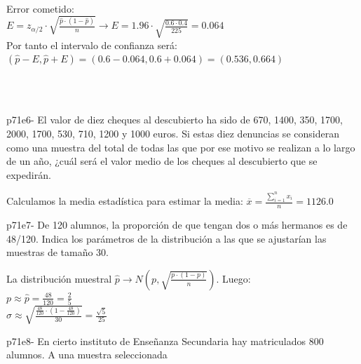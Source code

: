 \documentclass[spanish, 11pt]{exam}
\begin{document}
\begin{questions}
\begin{solution}
 \\
  Error cometido: \\ $E=z_{\alpha / 2}\cdot \sqrt{\frac{\widehat{p}\cdot\left(1-\widehat{p} \right)}{n}} \to E=1.96\cdot \sqrt{\frac{0.6\cdot0.4}{225}}=0.064$ \\ Por tanto el intervalo de confianza será: \\$\left(\widehat{p} - E , \widehat{p} + E \right)=\left(0.6 - 0.064 , 0.6 + 0.064 \right)=\left(0.536, 0.664 \right)$ \\  \\ 
   \\
     \end{solution}\question p71e6- El valor de diez cheques al descubierto ha sido de 670, 1400, 350, 1700, 2000, 1700, 530, 710, 1200 y 1000
euros. Si estas diez denuncias se consideran como una muestra del total de todas las que por ese motivo se
realizan a lo largo de un año, ¿cuál será el valor medio de los cheques al descubierto que se expedirán. \begin{solution}   Calculamos la media estadística para estimar la media: $\overline{x}=\frac{{\sum_{i=1}^n x_i }}{n} =1126.0$ \\   \end{solution}\question p71e7- De 120 alumnos, la proporción de que tengan dos o más hermanos es de 48/120. Indica los parámetros de la
distribución a las que se ajustarían las muestras de tamaño 30. \begin{solution}   La distribución muestral $\widehat{p} \rightarrow N \left ( p , \sqrt{ \frac{p \cdot (1-p)} {n}}\right )$. Luego: \\ $p \approx \widehat{p}=\frac{48}{120}=\frac{2}{5}$ \\ $\sigma \approx \sqrt{\frac{\frac{48}{120}\cdot \left(1-\frac{48}{120}\right)}{30}}=\frac{\sqrt{5}}{25}$ \\    \end{solution}\question p71e8- En cierto instituto de Enseñanza Secundaria hay matriculados 800 alumnos. A una muestra seleccionada

\end{questions}
\end{document}
